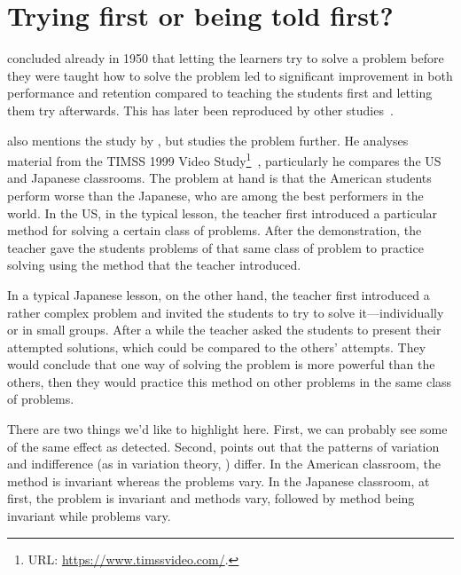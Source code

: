 \section{Trying first or being told first?}

\Textcite{Szekely1950} concluded already in 1950 that letting the learners try 
to solve a problem before they were taught how to solve the problem led to 
significant improvement in both performance and retention compared to teaching 
the students first and letting them try afterwards.
This has later been reproduced by other 
studies~\parencites{NecessaryConditionsOfLearning}[see 
\eg][]{BransfordSchwartz1999}.

\Textcite{NecessaryConditionsOfLearning} also mentions the study by 
\citeauthor{Szekely1950}, but studies the problem further.
He analyses material from the TIMSS 1999 Video Study\footnote{%
  URL: \url{https://www.timssvideo.com/}.
}~\parencite[see \eg][]{ClosingTeachingGap}, particularly he compares the US 
and Japanese classrooms.
The problem at hand is that the American students perform worse than the 
Japanese, who are among the best performers in the world.
In the US, in the typical lesson, the teacher first introduced a particular 
method for solving a certain class of problems.
After the demonstration, the teacher gave the students problems of that same 
class of problem to practice solving using the method that the teacher 
introduced.

In a typical Japanese lesson, on the other hand, the teacher first introduced a 
rather complex problem and invited the students to try to solve 
it---individually or in small groups.
After a while the teacher asked the students to present their attempted 
solutions, which could be compared to the others' attempts.
They would conclude that one way of solving the problem is more powerful than 
the others, then they would practice this method on other problems in the same 
class of problems.

There are two things we'd like to highlight here.
First, we can probably see some of the same effect as \textcite{Szekely1950} 
detected.
Second, \textcite{NecessaryConditionsOfLearning} points out that the patterns 
of variation and indifference (as in variation theory, \cite[see 
\eg][Ch.~2]{NecessaryConditionsOfLearning}) differ.
In the American classroom, the method is invariant whereas the problems vary.
In the Japanese classroom, at first, the problem is invariant and methods vary, 
followed by method being invariant while problems vary.

